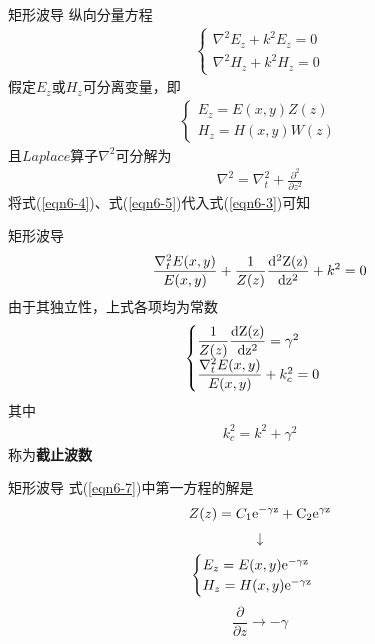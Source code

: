 \begin{frame}{矩形波导}
    纵向分量方程
    \begin{align}
        \begin{cases}
            \nabla^2E_z+k^2E_z=0\\
            \nabla^2H_z+k^2H_z=0
        \end{cases}
        \label{eqn6-3}
    \end{align}
    假定$E_z$或$H_z$可分离变量，即
    \begin{align}
        \begin{cases}
            E_z=E(x,y)Z(z)\\
            H_z=H(x,y)W(z)
        \end{cases}
        \label{eqn6-4}
    \end{align}
    且$Laplace$算子$\nabla^2$可分解为
    \begin{align}
        \nabla^2=\nabla_t^2+\frac{\partial^2}{\partial z^2}
        \label{eqn6-5}
    \end{align}
    将式(\ref{eqn6-4})、式(\ref{eqn6-5})代入式(\ref{eqn6-3})可知
\end{frame}

\begin{frame}{矩形波导}
    \begin{align}
        \frac{\nabla^2_t E(x,y)}{E(x,y)}+\frac{1}{Z(z)}\frac{\rm{d}^2 Z(z)}{\rm{d}z^2}+k^2=0
        \label{eqn6-6}
    \end{align}
    由于其独立性，上式各项均为常数
    \begin{align}
        \begin{cases}
            \dfrac{1}{Z(z)}\dfrac{\rm{d}Z(z)}{\rm{d}z^2}=\gamma^2\\
            \dfrac{\nabla_t^2E(x,y)}{E(x,y)}+k_c^2=0
        \end{cases}
        \label{eqn6-7}
    \end{align}
    其中
    \begin{align}
        k_c^2=k^2+\gamma^2
    \end{align}
    称为\textbf{截止波数}
\end{frame}

\begin{frame}{矩形波导}
    式(\ref{eqn6-7})中第一方程的解是
    \begin{align}
        Z(z)=C_1\rm{e}^{-\gamma z}+C_2\rm{e}^{\gamma z}
    \end{align}
    $$\downarrow$$
    \begin{align}
        \begin{cases}
            E_z=E(x,y)\rm{e}^{-\gamma z}\\
            H_z=H(x,y)\rm{e}^{-\gamma z}
        \end{cases}
    \end{align}
    $$\frac{\partial}{\partial z}\rightarrow -\gamma$$
\end{frame}

